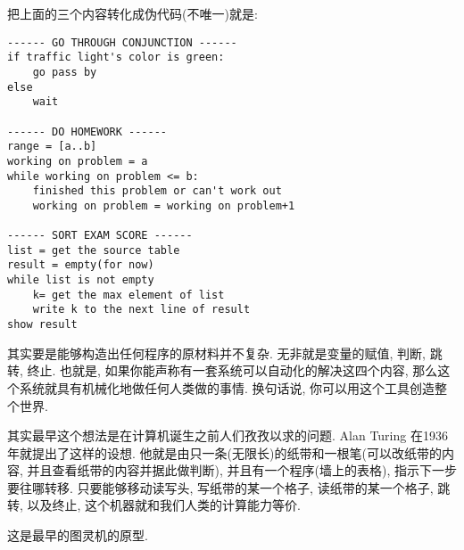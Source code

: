 把上面的三个内容转化成伪代码(不唯一)就是:
\begin{verbatim}
------ GO THROUGH CONJUNCTION ------
if traffic light's color is green:
    go pass by
else
    wait

------ DO HOMEWORK ------
range = [a..b]
working on problem = a
while working on problem <= b:
    finished this problem or can't work out
    working on problem = working on problem+1

------ SORT EXAM SCORE ------
list = get the source table
result = empty(for now)
while list is not empty
    k= get the max element of list
    write k to the next line of result
show result
\end{verbatim}
其实要是能够构造出任何程序的原材料并不复杂. 无非就是变量的赋值, 判断, 跳转, 终止. 也就是, 如果你能声称有一套系统可以自动化的解决这四个内容,
那么这个系统就具有机械化地做任何人类做的事情. 换句话说, 你可以用这个工具创造整个世界. 

其实最早这个想法是在计算机诞生之前人们孜孜以求的问题. Alan Turing 在1936年就提出了这样的设想. 他就是由只一条(无限长)的纸带和一根笔(可以改纸带的内容,
并且查看纸带的内容并据此做判断), 并且有一个程序(墙上的表格), 指示下一步要往哪转移. 只要能够移动读写头, 写纸带的某一个格子,
读纸带的某一个格子, 跳转, 以及终止, 这个机器就和我们人类的计算能力等价. 

这是最早的图灵机的原型. 


